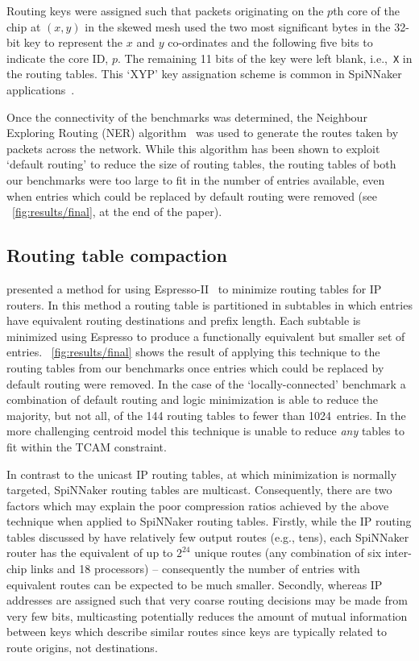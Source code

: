 \documentclass[conference]{IEEEtran}
\newcommand{\mytt}[1]{\texttt{\footnotesize#1}}
\begin{document}
Routing keys were assigned such that packets originating on the $p$th core of the chip at $(x, y)$ in the skewed mesh used the two most significant bytes in the 32-bit key to represent the $x$ and $y$ co-ordinates and the following five bits to indicate the core ID, $p$.
The remaining 11 bits of the key were left blank, i.e.,~\mytt{X} in the routing tables.
This `XYP' key assignation scheme is common in SpiNNaker applications~\parencite{Davies2012}.

Once the connectivity of the benchmarks was determined, the Neighbour Exploring Routing (NER) algorithm~\parencite{Navaridas2015} was used to generate the routes taken by packets across the network.
While this algorithm has been shown to exploit `default routing' to reduce the size of routing tables, the routing tables of both our benchmarks were too large to fit in the number of entries available, even when entries which could be replaced by default routing were removed (see \figurename~\ref{fig:results/final}, at the end of the paper).

\subsection{Routing table compaction}

\textcite{Liu2002} presented a method for using Espresso-II~\parencite{Brayton1984} to minimize routing tables for IP routers.
In this method a routing table is partitioned in subtables in which entries have equivalent routing destinations and prefix length.
Each subtable is minimized using Espresso to produce a functionally equivalent but smaller set of entries.
\figurename~\ref{fig:results/final} shows the result of applying this technique to the routing tables from our benchmarks once entries which could be replaced by default routing were removed.
In the case of the `locally-connected' benchmark a combination of default routing and logic minimization is able to reduce the majority, but not all, of the 144 routing tables to fewer than \num{1024}~entries.
In the more challenging centroid model this technique is unable to reduce \emph{any} tables to fit within the TCAM constraint.

In contrast to the unicast IP routing tables, at which minimization is normally targeted, SpiNNaker routing tables are multicast.
Consequently, there are two factors which may explain the poor compression ratios achieved by the above technique when applied to SpiNNaker routing tables.
Firstly, while the IP routing tables discussed by \textcite{Liu2002} have relatively few output routes (e.g., tens), each SpiNNaker router has the equivalent of up to $2^{24}$ unique routes (any combination of six inter-chip links and 18 processors) -- consequently the number of entries with equivalent routes can be expected to be much smaller.
Secondly, whereas IP addresses are assigned such that very coarse routing decisions may be made from very few bits, multicasting potentially reduces the amount of mutual information between keys which describe similar routes since keys are typically related to route origins, not destinations.
\end{document}
